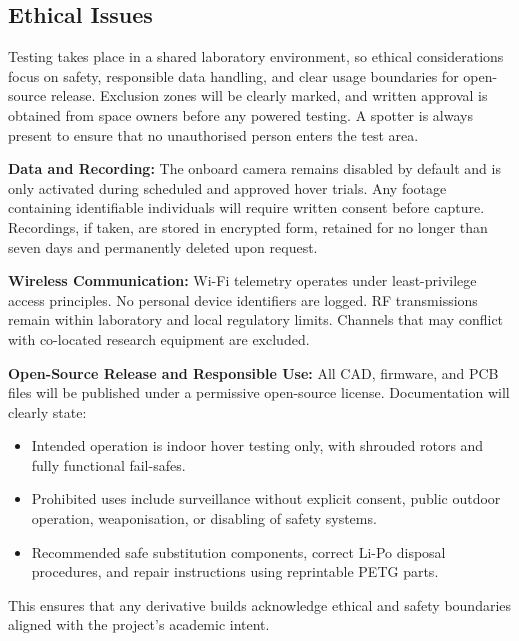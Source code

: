 \subsection{Ethical Issues}
Testing takes place in a shared laboratory environment, so ethical considerations focus on safety, responsible data handling, and clear usage boundaries for open-source release. Exclusion zones will be clearly marked, and written approval is obtained from space owners before any powered testing. A spotter is always present to ensure that no unauthorised person enters the test area.

\vspace{0.5em}
\textbf{Data and Recording:}  
The onboard camera remains disabled by default and is only activated during scheduled and approved hover trials. Any footage containing identifiable individuals will require written consent before capture. Recordings, if taken, are stored in encrypted form, retained for no longer than seven days and permanently deleted upon request.

\vspace{0.5em}
\textbf{Wireless Communication:}  
Wi-Fi telemetry operates under least-privilege access principles. No personal device identifiers are logged. RF transmissions remain within laboratory and local regulatory limits. Channels that may conflict with co-located research equipment are excluded.

\vspace{0.5em}
\textbf{Open-Source Release and Responsible Use:}  
All CAD, firmware, and PCB files will be published under a permissive open-source license. Documentation will clearly state:

\begin{itemize}
    \item Intended operation is indoor hover testing only, with shrouded rotors and fully functional fail-safes.
    \item Prohibited uses include surveillance without explicit consent, public outdoor operation, weaponisation, or disabling of safety systems.
    \item Recommended safe substitution components, correct Li-Po disposal procedures, and repair instructions using reprintable PETG parts.
\end{itemize}

This ensures that any derivative builds acknowledge ethical and safety boundaries aligned with the project's academic intent.

